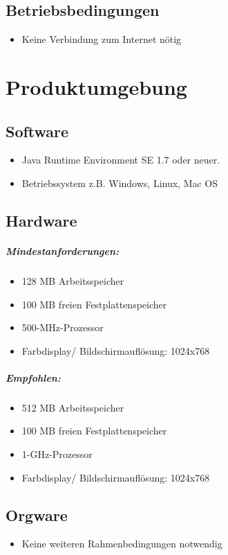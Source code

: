 \documentclass[10pt,a4paper]{article}
\begin{document}
\subsection{Betriebsbedingungen}
\begin{itemize}
\item Keine Verbindung zum Internet nötig
\end{itemize}


\section{Produktumgebung}
\subsection{Software}
\begin{itemize}
\item Java Runtime Environment SE 1.7 oder neuer.
\item Betriebssystem z.B. Windows, Linux, Mac OS
\end{itemize}


\subsection{Hardware}
\subparagraph{Mindestanforderungen:}
\begin{itemize}
\item 128 MB Arbeitsspeicher
\item 100 MB freien Festplattenspeicher
\item 500-MHz-Prozessor
\item Farbdisplay/ Bildschirmauflösung: 1024x768
\end{itemize}

\subparagraph{Empfohlen:}
\begin{itemize}
\item 512 MB Arbeitsspeicher
\item 100 MB freien Festplattenspeicher
\item 1-GHz-Prozessor
\item Farbdisplay/ Bildschirmauflösung: 1024x768
\end{itemize}


\subsection{Orgware}
\begin{itemize}
\item Keine weiteren Rahmenbedingungen notwendig
\end{itemize}
\end{document}
